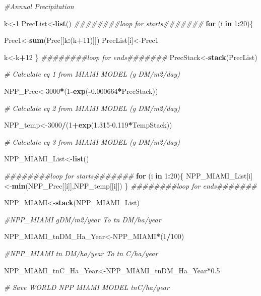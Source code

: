 \documentclass[
  10pt,
  b5paper,
]{book}
\newenvironment{Shaded}{\begin{snugshade}}{\end{snugshade}}
\newcommand{\CommentTok}[1]{\textcolor[rgb]{0.56,0.35,0.01}{\textit{#1}}}
\newcommand{\ControlFlowTok}[1]{\textcolor[rgb]{0.13,0.29,0.53}{\textbf{#1}}}
\newcommand{\DecValTok}[1]{\textcolor[rgb]{0.00,0.00,0.81}{#1}}
\newcommand{\FloatTok}[1]{\textcolor[rgb]{0.00,0.00,0.81}{#1}}
\newcommand{\KeywordTok}[1]{\textcolor[rgb]{0.13,0.29,0.53}{\textbf{#1}}}
\newcommand{\NormalTok}[1]{#1}
\newcommand{\OperatorTok}[1]{\textcolor[rgb]{0.81,0.36,0.00}{\textbf{#1}}}
\begin{document}
\begin{Shaded}
\begin{Highlighting}[]
\CommentTok{#Annual Precipitation}

\NormalTok{k<-}\DecValTok{1}
\NormalTok{PrecList<-}\KeywordTok{list}\NormalTok{()}
\CommentTok{########loop for starts#######}
\ControlFlowTok{for}\NormalTok{ (i }\ControlFlowTok{in} \DecValTok{1}\OperatorTok{:}\DecValTok{20}\NormalTok{)\{}

\NormalTok{Prec1<-}\KeywordTok{sum}\NormalTok{(Prec[[k}\OperatorTok{:}\NormalTok{(k}\OperatorTok{+}\DecValTok{11}\NormalTok{)]])}
\NormalTok{PrecList[i]<-Prec1}

\NormalTok{k<-k}\OperatorTok{+}\DecValTok{12}
\NormalTok{\}}
\CommentTok{########loop for ends#######}
\NormalTok{PrecStack<-}\KeywordTok{stack}\NormalTok{(PrecList)}

\CommentTok{# Calculate eq 1 from MIAMI MODEL (g DM/m2/day)}

\NormalTok{NPP_Prec<-}\DecValTok{3000}\OperatorTok{*}\NormalTok{(}\DecValTok{1}\OperatorTok{-}\KeywordTok{exp}\NormalTok{(}\OperatorTok{-}\FloatTok{0.000664}\OperatorTok{*}\NormalTok{PrecStack))}

\CommentTok{# Calculate eq 2 from MIAMI MODEL (g DM/m2/day)}

\NormalTok{NPP_temp<-}\DecValTok{3000}\OperatorTok{/}\NormalTok{(}\DecValTok{1}\OperatorTok{+}\KeywordTok{exp}\NormalTok{(}\FloatTok{1.315-0.119}\OperatorTok{*}\NormalTok{TempStack))}

\CommentTok{# Calculate eq 3 from MIAMI MODEL (g DM/m2/day)}

\NormalTok{NPP_MIAMI_List<-}\KeywordTok{list}\NormalTok{()}

\CommentTok{########loop for starts#######}
\ControlFlowTok{for}\NormalTok{ (i }\ControlFlowTok{in} \DecValTok{1}\OperatorTok{:}\DecValTok{20}\NormalTok{)\{}
\NormalTok{NPP_MIAMI_List[i]<-}\KeywordTok{min}\NormalTok{(NPP_Prec[[i]],NPP_temp[[i]])}
\NormalTok{\}}
\CommentTok{########loop for ends#######}

\NormalTok{NPP_MIAMI<-}\KeywordTok{stack}\NormalTok{(NPP_MIAMI_List)}

\CommentTok{#NPP_MIAMI gDM/m2/year To tn DM/ha/year}

\NormalTok{NPP_MIAMI_tnDM_Ha_Year<-NPP_MIAMI}\OperatorTok{*}\NormalTok{(}\DecValTok{1}\OperatorTok{/}\DecValTok{100}\NormalTok{)}

\CommentTok{#NPP_MIAMI tn DM/ha/year To tn C/ha/year}

\NormalTok{NPP_MIAMI_tnC_Ha_Year<-NPP_MIAMI_tnDM_Ha_Year}\OperatorTok{*}\FloatTok{0.5}

\CommentTok{# Save WORLD NPP MIAMI MODEL tnC/ha/year}


\end{Highlighting}
\end{Shaded}
\end{document}
